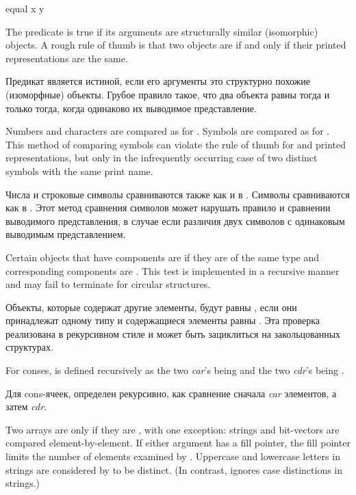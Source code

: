 \begin{defun}[Function]
equal x y

The  predicate is true if its arguments are structurally similar
(isomorphic) objects.  A rough rule of thumb is that two objects
are  if and only if their printed representations are the same.

Предикат  является истиной, если его аргументы это структурно похожие
(изоморфные) объекты. Грубое правило такое, что два объекта равны 
тогда и только тогда, когда одинаково их выводимое представление.

Numbers and characters are compared as for .
Symbols are compared as for .  This method
of comparing symbols can violate the rule
of thumb for  and printed representations,
but only in the infrequently occurring case of two distinct
symbols with the same print name.

Числа и строковые символы сравниваются также как и в .
Символы сравниваются как в . Этот метод сравнения символов может
нарушать правило и сравнении выводимого представления, в случае если различия
двух символов с одинаковым выводимым представлением.

Certain objects that have components are  if they are of the same
type and corresponding components are .
This test is implemented in a recursive manner and may fail to
terminate for circular structures.

Объекты, которые содержат другие элементы, будут равны , если они
принадлежат одному типу и содержащиеся элементы равны .
Эта проверка реализована в рекурсивном стиле и может быть зациклиться на
закольцованных структурах.

For conses,  is defined recursively as
the two \emph{car}'s being  and the two \emph{cdr}'s being
.

Для cons-ячеек,  определен рекурсивно, как сравнение 
сначала \emph{car} элементов, а затем \emph{cdr}.

Two arrays are  only if they are ,
with one exception:
strings and bit-vectors are compared element-by-element.
If either argument has a fill pointer, the fill pointer limits
the number of elements examined by .
Uppercase and lowercase letters in strings are considered by
 to be distinct.  (In contrast,  ignores
case distinctions in strings.)


\end{defun}
